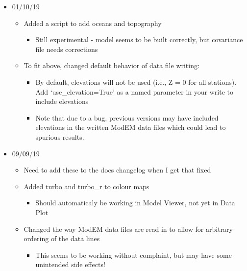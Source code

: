 \documentclass[letterpaper,10pt,english]{sphinxmanual}
\begin{document}
\begin{itemize}
\begin{itemize}
\begin{itemize}
\end{itemize}

\end{itemize}

\item {} 
01/10/19
\begin{itemize}
\item {} 
Added a script to add oceans and topography
\begin{itemize}
\item {} 
Still experimental - model seems to be built correctly, but covariance file needs corrections

\end{itemize}

\item {} 
To fit above, changed default behavior of data file writing:
\begin{itemize}
\item {} 
By default, elevations will not be used (i.e., Z = 0 for all stations). Add ‘use\_elevation=True’ as a named parameter in your write to include elevations

\item {} 
Note that due to a bug, previous versions may have included elevations in the written ModEM data files which could lead to spurious results.

\end{itemize}

\end{itemize}

\item {} 
09/09/19
\begin{itemize}
\item {} 
Need to add these to the docs changelog when I get that fixed

\item {} 
Added turbo and turbo\_r to colour maps
\begin{itemize}
\item {} 
Should automaticaly be working in Model Viewer, not yet in Data Plot

\end{itemize}

\item {} 
Changed the way ModEM data files are read in to allow for arbitrary ordering of the data lines
\begin{itemize}
\item {} 
This seems to be working without complaint, but may have some unintended side effects!


\end{itemize}
\end{itemize}
\end{itemize}
\end{document}
